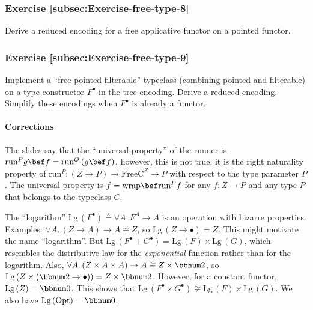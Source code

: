 \subsubsection{Exercise \label{subsec:Exercise-free-type-8}\ref{subsec:Exercise-free-type-8}}

Derive a reduced encoding for a free applicative functor on a pointed
functor.

\subsubsection{Exercise \label{subsec:Exercise-free-type-9}\ref{subsec:Exercise-free-type-9}}

Implement a \textsf{``}free pointed filterable\textsf{''} typeclass (combining pointed
and filterable) on a type constructor $F^{\bullet}$ in the tree encoding.
Derive a reduced encoding. Simplify these encodings when $F^{\bullet}$
is already a functor.

\paragraph{Corrections}

The slides say that the \textsf{``}universal property\textsf{''} of the runner is
$\text{run}^{P}g\bef f=\text{run}^{Q}\left(g\bef f\right)$, however,
this is not true; it is the right naturality property of $\text{run}^{P}:\left(Z\rightarrow P\right)\rightarrow\text{FreeC}^{Z}\rightarrow P$
with respect to the type parameter $P$. The universal property is
$f=\text{wrap}\bef\text{run}^{P}f$ for any $f:Z\rightarrow P$ and
any type $P$ that belongs to the typeclass $C$.

The \textsf{``}logarithm\textsf{''} $\text{Lg}\,(F^{\bullet})\triangleq\forall A.\,F^{A}\rightarrow A$
is an operation with bizarre properties. Examples: $\forall A.\,\left(Z\rightarrow A\right)\rightarrow A\cong Z$,
so $\text{Lg}\,(Z\rightarrow\bullet)=Z$. This might motivate the
name \textsf{``}logarithm\textsf{''}. But $\text{Lg}\,(F^{\bullet}+G^{\bullet})=\text{Lg}\,(F)\times\text{Lg}\,(G)$,
which resembles the distributive law for the \emph{exponential} function
rather than for the logarithm. Also, $\forall A.\,(Z\times A\times A)\rightarrow A\cong Z\times\bbnum 2$,
so $\text{Lg}\,(Z\times(\bbnum 2\rightarrow\bullet))=Z\times\bbnum 2$.
However, for a constant functor, $\text{Lg}\,(Z)=\bbnum 0$. This
shows that $\text{Lg}\,(F^{\bullet}\times G^{\bullet})\not\cong\text{Lg}\,(F)\times\text{Lg}\,(G)$.
We also have $\text{Lg}\,(\text{Opt})=\bbnum 0$.

